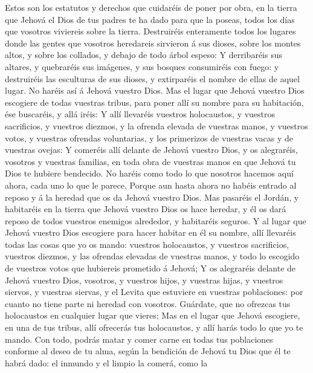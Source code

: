  Estos son los estatutos y derechos que cuidaréis de poner
por obra, en la tierra que Jehová el Dios de tus padres te ha dado para
que la poseas, todos los días que vosotros viviereis sobre la tierra.
 Destruiréis enteramente todos los lugares donde las gentes
que vosotros heredareis sirvieron á sus dioses, sobre los montes altos,
y sobre los collados, y debajo de todo árbol espeso:  Y
derribaréis sus altares, y quebraréis sus imágenes, y sus bosques
consumiréis con fuego: y destruiréis las esculturas de sus dioses, y
extirparéis el nombre de ellas de aquel lugar.  No haréis
así á Jehová vuestro Dios.  Mas el lugar que Jehová vuestro
Dios escogiere de todas vuestras tribus, para poner allí su nombre para
su habitación, ése buscaréis, y allá iréis:  Y allí
llevaréis vuestros holocaustos, y vuestros sacrificios, y vuestros
diezmos, y la ofrenda elevada de vuestras manos, y vuestros votos, y
vuestras ofrendas voluntarias, y los primerizos de vuestras vacas y de
vuestras ovejas:  Y comeréis allí delante de Jehová vuestro
Dios, y os alegraréis, vosotros y vuestras familias, en toda obra de
vuestras manos en que Jehová tu Dios te hubiere bendecido. 
No haréis como todo lo que nosotros hacemos aquí ahora, cada uno lo que
le parece,  Porque aun hasta ahora no habéis entrado al
reposo y á la heredad que os da Jehová vuestro Dios.  Mas
pasaréis el Jordán, y habitaréis en la tierra que Jehová vuestro Dios os
hace heredar, y él os dará reposo de todos vuestros enemigos alrededor,
y habitaréis seguros.  Y al lugar que Jehová vuestro Dios
escogiere para hacer habitar en él su nombre, allí llevaréis todas las
cosas que yo os mando: vuestros holocaustos, y vuestros sacrificios,
vuestros diezmos, y las ofrendas elevadas de vuestras manos, y todo lo
escogido de vuestros votos que hubiereis prometido á Jehová;
 Y os alegraréis delante de Jehová vuestro Dios, vosotros,
y vuestros hijos, y vuestras hijas, y vuestros siervos, y vuestras
siervas, y el Levita que estuviere en vuestras poblaciones: por cuanto
no tiene parte ni heredad con vosotros.  Guárdate, que no
ofrezcas tus holocaustos en cualquier lugar que vieres; 
Mas en el lugar que Jehová escogiere, en una de tus tribus, allí
ofrecerás tus holocaustos, y allí harás todo lo que yo te mando.
 Con todo, podrás matar y comer carne en todas tus
poblaciones conforme al deseo de tu alma, según la bendición de Jehová
tu Dios que él te habrá dado: el inmundo y el limpio la comerá, como la
